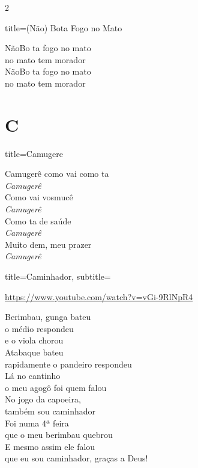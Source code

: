 \documentclass[fontsize=14pt, paper=a4, twoside, DIV=20]{scrreprt} %
\newcommand\chapTOC[1]{
    \chapter*{#1}
    \addcontentsline{toc}{chapter}{#1}
    \markboth{#1}{#1}}
\begin{document}
\begin{multicols*}{2}
\begin{song}{title={(Não) Bota Fogo no Mato}}
         \begin{verse*}
             NãoBo ta fogo no mato\\
             no mato tem morador \\
             NãoBo ta fogo no mato\\
             no mato tem morador \\
         \end{verse*}
 \end{song}

 \chapTOC{C}


\begin{song}{title={Camugere}}
        \begin{verse*}
            Camugerê como vai como ta\\
            \textit{Camugerê}\\
            Como vai vosmucê\\
            \textit{Camugerê}\\
            Como ta de saúde\\
            \textit{Camugerê}\\
            Muito dem, meu prazer\\
            \textit{Camugerê}\\
        \end{verse*}
\end{song}


\begin{song}{title={Caminhador}, subtitle={\begin{small}
        \url{https://www.youtube.com/watch?v=vGi-9RlNpR4}
\end{small}}}

    \begin{verse*}
       Berimbau, gunga bateu\\
       o médio respondeu\\
       e o viola chorou\\
       Atabaque bateu\\
       rapidamente o pandeiro respondeu\\
       Lá no cantinho\\
       o meu agogô foi quem falou\\
       No jogo da capoeira,\\
       também sou caminhador\\

       Foi numa 4ª feira\\
       que o meu berimbau quebrou\\
       E mesmo assim ele falou\\
       que eu sou caminhador, graças a Deus!\\


\end{verse*}
\end{song}
\end{multicols*}
\end{document}
